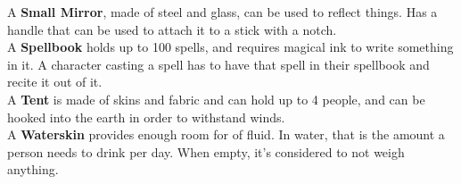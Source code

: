 A \textbf{Small Mirror}, made of steel and glass, can be used to reflect things. Has a handle that can be used to attach it to a stick with a notch.\\

A \textbf{Spellbook} holds up to 100 spells, and requires magical ink to write something in it. A character casting a spell has to have that spell in their spellbook and recite it out of it.\\

A \textbf{Tent} is made of skins and fabric and can hold up to 4 people, and can be hooked into the earth in order to withstand winds.\\

A \textbf{Waterskin} provides enough room for  of fluid. In water, that is the amount a person needs to drink per day. When empty, it's considered to not weigh anything.\\